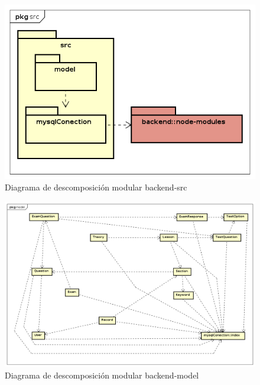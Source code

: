 \documentclass[openright,twoside,10pt]{book}
\begin{document}
    \vspace*{\fill} \newpage
    \vspace*{\fill}
    
    \begin{figure}[H]
        \begin{center}
            \includegraphics[width=\textwidth]{img/astah/disenio/descomposicion/back/src.png}
        \end{center}
        \caption{Diagrama de descomposición modular backend-src}
    \end{figure}
    
    \vspace*{\fill} \newpage
    \vspace*{\fill}
    
    \begin{figure}[H]
        \begin{center}
            \includegraphics[width=\textwidth, angle=-90]{img/astah/disenio/descomposicion/back/model.png}
        \end{center}
        \caption{Diagrama de descomposición modular backend-model}
    \end{figure}
    
\end{document}
